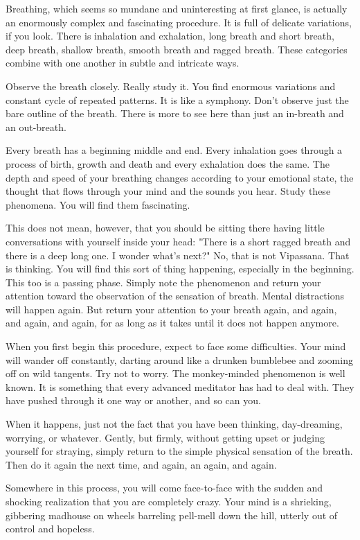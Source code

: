 Breathing, which seems so mundane and uninteresting at first glance, is actually
an enormously complex and fascinating procedure. It is full of delicate
variations, if you look. There is inhalation and exhalation, long breath and
short breath, deep breath, shallow breath, smooth breath and ragged breath.
These categories combine with one another in subtle and intricate ways.

Observe the breath closely. Really study it. You find enormous variations and
constant cycle of repeated patterns. It is like a symphony. Don't observe just
the bare outline of the breath. There is more to see here than just an in-breath
and an out-breath.

Every breath has a beginning middle and end. Every inhalation goes through a
process of birth, growth and death and every exhalation does the same. The depth
and speed of your breathing changes according to your emotional state, the
thought that flows through your mind and the sounds you hear. Study these
phenomena. You will find them fascinating.

This does not mean, however, that you should be sitting there having little
conversations with yourself inside your head: "There is a short ragged breath
and there is a deep long one. I wonder what's next?" No, that is not Vipassana.
That is thinking. You will find this sort of thing happening, especially in the
beginning. This too is a passing phase. Simply note the phenomenon and return
your attention toward the observation of the sensation of breath. Mental
distractions will happen again. But return your attention to your breath again,
and again, and again, and again, for as long as it takes until it does not
happen anymore.

When you first begin this procedure, expect to face some difficulties. Your mind
will wander off constantly, darting around like a drunken bumblebee and zooming
off on wild tangents. Try not to worry. The monkey-minded phenomenon is well
known. It is something that every advanced meditator has had to deal with. They
have pushed through it one way or another, and so can you.

When it happens, just not the fact that you have been thinking, day-dreaming,
worrying, or whatever. Gently, but firmly, without getting upset or judging
yourself for straying, simply return to the simple physical sensation of the
breath. Then do it again the next time, and again, an again, and again.

Somewhere in this process, you will come face-to-face with the sudden and
shocking realization that you are completely crazy.
Your mind is a shrieking, gibbering madhouse on wheels barreling pell-mell down the hill, utterly out of control and hopeless.

